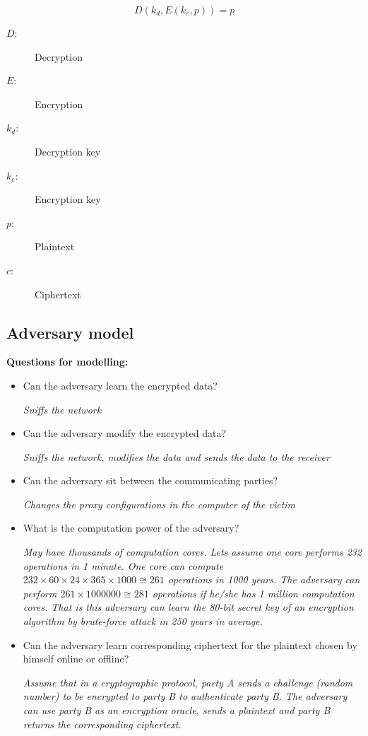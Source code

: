 \documentclass[12pt]{article}
\begin{document}
\[D(k_d, E(k_e, p)) = p\]

\begin{description}
    \item[\(D\):] Decryption
    \item[\(E\):] Encryption
    \item[\(k_d\):] Decryption key
    \item[\(k_e\):] Encryption key
    \item[\(p\):] Plaintext     
    \item[\(c\):] Ciphertext 
\end{description}

\subsection*{Adversary model}
\textbf{Questions for modelling:}
\begin{itemize}
    \item Can the adversary learn the encrypted data?
    
    \emph{Sniffs the network}
    \item Can the adversary modify the encrypted data?
    
    \emph{Sniffs the network, modifies the data and sends the data to the receiver}
    \item Can the adversary sit between the communicating parties?
    
    \emph{Changes the proxy configurations in the computer of the victim}
    \item What is the computation power of the adversary?
    
    \emph{May have thousands of computation cores. Lets assume one core performs 232
    operations in 1 minute. One core can compute \(232 \times 60 \times 24 \times 365 \times 1000 \cong 261\)
    operations in 1000 years. The adversary can perform \(261 \times 1000000 \cong 281\) operations
    if he/she has 1 million computation cores. That is this adversary can learn the 80-bit
    secret key of an encryption algorithm by brute-force attack in 250 years in average.}
    \item Can the adversary learn corresponding ciphertext for the plaintext chosen by himself online or offline?
    
    \emph{Assume that in a cryptographic protocol, party A sends a challenge (random number) to
    be encrypted to party B to authenticate party B. The adversary can use party B as an
    encryption oracle, sends a plaintext and party B returns the corresponding ciphertext.}
\end{itemize}
\end{document}
